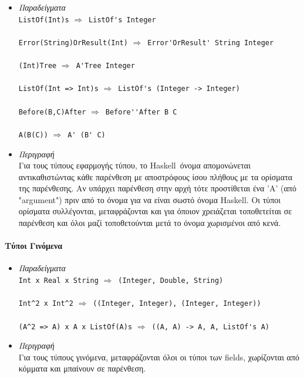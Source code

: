 \documentclass[diploma]{softlab-thesis}
\def\H{Haskell}
\def\lra{$\Longrightarrow$\ }
\begin{document}
\begin{itemize}
\item
\textit{Παραδείγματα}\\

\verb|ListOf(Int)s| \lra \verb|ListOf's Integer|\\\\
\verb|Error(String)OrResult(Int)| \lra \verb|Error'OrResult' String Integer|\\\\
\verb|(Int)Tree| \lra \verb|A'Tree Integer|\\\\
\verb|ListOf(Int => Int)s| \lra \verb|ListOf's (Integer -> Integer)|\\\\
\verb|Before(B,C)After| \lra \verb|Before''After B C|\\\\
\verb|A(B(C))| \lra \verb|A' (B' C)|\\

\item
\textit{Περιγραφή}\\

Για τους τύπους εφαρμογής τύπου, το \H\ όνομα απομονώνεται αντικαθιστώντας
κάθε παρένθεση με αποστρόφους ίσου πλήθους με τα ορίσματα της παρένθεσης.
Αν υπάρχει παρένθεση στην αρχή τότε προστίθεται ένα 'A' (από "argument")
πριν από το όνομα για να είναι σωστό όνομα \H. Οι τύποι ορίσματα συλλέγονται,
μεταφράζονται και για όποιον χρειάζεται τοποθετείται σε παρένθεση και όλοι
μαζί τοποθετούνται μετά το όνομα χωρισμένοι από κενά.

\end{itemize}

\paragraph{Τύποι Γινόμενα}

\begin{itemize}
\item
\textit{Παραδείγματα}\\

\verb|Int x Real x String| \lra \verb|(Integer, Double, String)|\\\\
\verb|Int^2 x Int^2| \lra \verb|((Integer, Integer), (Integer, Integer))|\\\\
\verb|(A^2 => A) x A x ListOf(A)s| \lra \verb|((A, A) -> A, A, ListOf's A)|\\
\item
\textit{Περιγραφή}\\

Για τους τύπους γινόμενα, μεταφράζονται όλοι οι τύποι των fields, χωρίζονται
από κόμματα και μπαίνουν σε παρένθεση.

\end{itemize}
\end{document}

